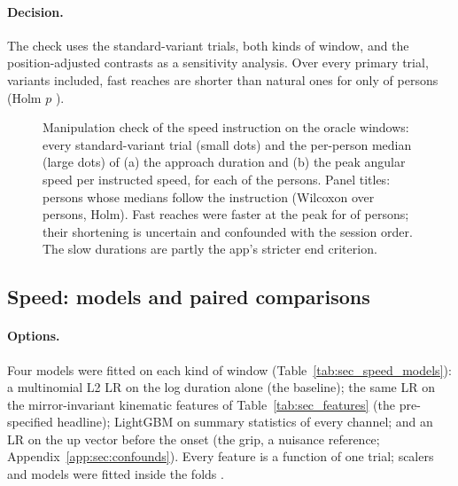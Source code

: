 \paragraph{Decision.} The check uses the standard-variant trials, both kinds of window, and the position-adjusted
contrasts as a sensitivity analysis. Over every primary trial, variants included, fast reaches are shorter than
natural ones for only  of 
persons (Holm $p$ ).

\begin{figure}[tbp]
\centering
{}
\caption{Manipulation check of the speed instruction on the oracle windows: every standard-variant trial (small
dots) and the per-person median (large dots) of (a) the approach duration and (b) the peak angular speed per
instructed speed, for each of the  persons. Panel titles: persons whose medians
follow the instruction (Wilcoxon over persons, Holm). Fast reaches were faster at the peak for
 of  persons; their
shortening is uncertain and confounded with the session order. The slow durations are partly the app's stricter
end criterion.}
\label{fig:SEC_01_speed_manipulation}\label{fig:app:sec-manipulation}
\end{figure}


\FloatBarrier
\subsection{Speed: models and paired comparisons}\label{app:sec:speed-models}

\paragraph{Options.} Four models were fitted on each kind of window (Table~\ref{tab:sec_speed_models}): a
multinomial L2 LR on the log duration alone (the baseline); the same LR on the 
mirror-invariant kinematic features of Table~\ref{tab:sec_features} (the pre-specified headline); LightGBM on
summary statistics of every channel; and an LR on the up vector before the onset (the grip, a nuisance reference;
Appendix~\ref{app:sec:confounds}). Every feature is a function of one trial; scalers and models were fitted inside
the folds \cite{pedregosa2011sklearn}.

